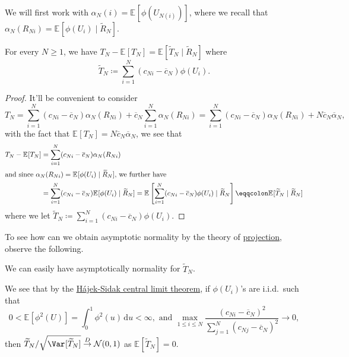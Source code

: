 We will first work with \(\alpha _N(i) = \mathbb{E}_{}[\phi (U_{N(i)})] \), where we recall that \(\alpha _N(R_{Ni}) = \mathbb{E}_{}[\phi (U_i) \mid \widetilde{R} _N]\).

\begin{proposition}
	For every \(N \geq 1\), we have \(T_N - \mathbb{E}_{}[T_N] = \mathbb{E}_{}[\widetilde{T} _N \mid \widetilde{R} _N] \) where
	\[
		\widetilde{T} _N
		\coloneqq \sum_{i=1}^{N} (c_{Ni} - \overline{c} _N) \phi (U_i).
	\]
\end{proposition}
\begin{proof}
	It'll be convenient to consider
	\[
		T_N
		= \sum_{i=1}^{N} (c_{Ni} - \overline{c} _N) \alpha _N(R_{Ni}) + \overline{c} _N \sum_{i=1}^{N} \alpha _N(R_{Ni})
		= \sum_{i=1}^{N} (c_{Ni} - \overline{c} _N) \alpha _N(R_{Ni}) + N \overline{c} _N \overline{\alpha} _N,
	\]
	with the fact that \(\mathbb{E}_{}[T_N] = N \overline{c} _N \overline{\alpha} _N\), we see that
	\begin{align*}
		T_N - \mathbb{E}_{}[T_N]
		 & = \sum_{i=1}^{N} (c_{Ni} - \overline{c} _N) \alpha _N(R_{Ni})                               \\
		\shortintertext{and since \(\alpha _N(R_{Ni}) = \mathbb{E}_{}[\phi (U_i) \mid \widetilde{R} _N]\), we further have}
		 & = \sum_{i=1}^{N} (c_{Ni} - \overline{c} _N) \mathbb{E}_{}[\phi (U_i) \mid \widetilde{R} _N]
		= \mathbb{E}_{}\left[\sum_{i=1}^{N} (c_{Ni} - \overline{c} _N) \phi (U_i) \mid \widetilde{R} _N\right]
		\eqqcolon \mathbb{E}_{}[\widetilde{T} _N \mid \widetilde{R} _N]
	\end{align*}
	where we let \(\widetilde{T} _N \coloneqq \sum_{i=1}^{N} (c_{Ni} - \overline{c} _N) \phi (U_i)\).
\end{proof}

To see how can we obtain asymptotic normality by the theory of \hyperref[def:projection]{projection}, observe the following.

\begin{claim}\label{clm:simple-linear-rank-statistic-asymptotic-normality}
	We can easily have asymptotically normality for \(\widetilde{T} _N\).
\end{claim}
\begin{explanation}
	We see that by the \hyperref[thm:Hajek-Sidak-CLT]{Hájek-Sidak central limit theorem}, if \(\phi (U_i)\)'s are i.i.d.\ such that
	\[
		0 < \mathbb{E}_{}[\phi ^2(U)] = \int_{0}^{1} \phi ^2(u) \,\mathrm{d}u < \infty, \text{ and }
		\max _{1 \leq i \leq N} \frac{(c_{Ni} - \overline{c} _N)^2}{\sum_{j=1}^{N} (c_{Nj} - \overline{c} _N)^2} \to 0,
	\]
	then \(\widetilde{T} _N / \sqrt{\Var_{}[\widetilde{T} _N] } \overset{D}{\to} \mathcal{N} (0, 1)\) as \(\mathbb{E}_{}[\widetilde{T} _N] = 0 \).
\end{explanation}

